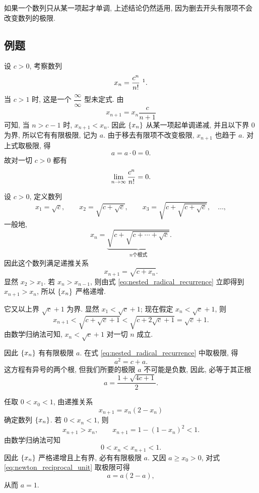 如果一个数列只从某一项起才单调, 上述结论仍然适用,
因为删去开头有限项不会改变数列的极限.

\subsection{例题}\label{subsec:35}

\label{ex:factorial_dominates_exponential}
设 $c>0$, 考察数列
$$
x_n=\frac{c^n}{n!} \ \footnotemark.
$$
当 $c>1$ 时, 这是一个 $\dfrac{\infty}{\infty}$ 型未定式. 由
$$
x_{n+1}=x_n\frac{c}{n+1}
$$
可知, 当 $n>c-1$ 时, $x_{n+1}<x_n$. 因此 $\{x_{n}\}$ 从某一项起单调递减,
并且以下界 $0$ 为界, 所以它有有限极限, 记为 $a$. 由于移去有限项不改变极限,
$x_{n+1}$ 也趋于 $a$. 对上式取极限, 得
$$
a=a\cdot0=0.
$$
故对一切 $c>0$ 都有
$$
\lim\limits_{n \to \infty}\frac{c^n}{n!}=0.
$$

\label{ex:nested_radical_limit}
设 $c>0$, 定义数列
$$
x_1=\sqrt c,\qquad
x_2=\sqrt{c+\sqrt c},\qquad
x_3=\sqrt{c+\sqrt{c+\sqrt c}},\quad\ldots,
$$
一般地,
$$
x_n=\underbrace{\sqrt{c+\sqrt{c+\cdots+\sqrt c}}}_{n \text{个根式}}.
$$
因此这个数列满足递推关系
\begin{equation}\label{eq:nested_radical_recurrence}
x_{n+1}=\sqrt{c+x_n}.
\end{equation}
显然 $x_2>x_1$. 若 $x_n>x_{n-1}$, 则由式
\eqref{eq:nested_radical_recurrence} 立即得到 $x_{n+1}>x_n$,
所以 $\{x_{n}\}$ 严格递增.

它又以上界 $\sqrt c+1$ 为界.
显然 $x_1<\sqrt c+1$;
现在假定 $x_n<\sqrt c+1$, 则
$$
x_{n+1}<\sqrt{c+\sqrt c+1}<\sqrt{c+2\sqrt c+1}=\sqrt c+1.
$$
由数学归纳法可知, $x_n<\sqrt c+1$ 对一切 $n$ 成立.

因此 $\{x_{n}\}$ 有有限极限 $a$. 在式
\eqref{eq:nested_radical_recurrence} 中取极限, 得
$$
a^2=c+a.
$$
这方程有异号的两个根, 但我们所要的极限 $a$ 不可能是负数,
因此, 必等于其正根
$$
a=\frac{1+\sqrt{4c+1}}{2}.
$$

\label{ex:newton_reciprocal_iteration}
任取 $0<x_0<1$, 由递推关系
\begin{equation}\label{eq:newton_reciprocal_unit}
x_{n+1}=x_n(2-x_n)
\end{equation}
确定数列 $\{x_{n}\}$. 若 $0<x_n<1$, 则
$$
x_{n+1}>x_n,\qquad
x_{n+1}=1-(1-x_n)^2<1.
$$
由数学归纳法可知
$$
0<x_n<x_{n+1}<1.
$$
因此 $\{x_{n}\}$ 严格递增且上有界, 必有有限极限 $a$.
又因 $a\geqslant x_0>0$, 对式 \eqref{eq:newton_reciprocal_unit} 取极限可得
$$
a=a(2-a),
$$
从而 $a=1$.

